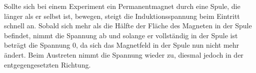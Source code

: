 Sollte sich bei einem Experiment ein Permanentmagnet durch eine Spule, die länger als er selbst ist, bewegen, steigt die Induktionsspannung beim Eintritt schnell an. Sobald sich mehr als die Hälfte der Fläche des Magneten in der Spule befindet, nimmt die Spannung ab und solange er vollständig in der Spule ist beträgt die Spannung 0, da sich das Magnetfeld in der Spule nun nicht mehr ändert. Beim Austreten nimmt die Spannung wieder zu, diesmal jedoch in der entgegengesetzten Richtung.